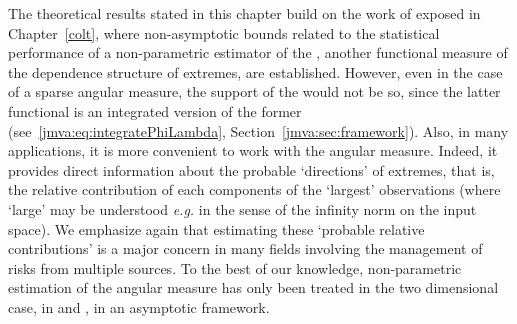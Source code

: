 





The theoretical results stated in this chapter build on the work
of %
\cite{COLT15} exposed in Chapter~\ref{colt}, where non-asymptotic bounds related to the statistical performance of a non-parametric estimator of the \stdf, another functional measure of the dependence structure of extremes,  are established.  
However, even in the case of a sparse angular measure, the support of
the \stdf would not be so, since the latter functional is  an
integrated version of the former (see~\eqref{jmva:eq:integratePhiLambda},
 Section~\ref{jmva:sec:framework}). Also, 
in many applications, it is more convenient to work with %
 the {angular
  measure}. Indeed, it  provides
direct  information about the
probable `directions' of extremes, that is, the relative contribution
of each components of the `largest' observations  (where `large' may be 
understood \emph{e.g.} in the sense of the infinity norm on the input
space). We emphasize again that estimating these `probable relative contributions' is a major concern in many fields
involving  the management of risks from multiple sources.
To the best of our knowledge, non-parametric estimation of the angular
measure has only been treated in the two dimensional case, in
\cite{Einmahl2001} and \cite{Einmahl2009}, in an asymptotic
framework.

